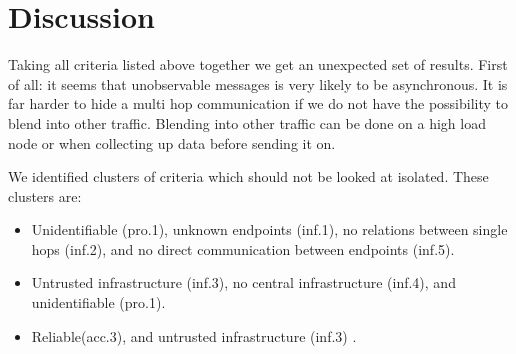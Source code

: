 \documentclass[12pt,journal,compsoc]{IEEEtran}
\begin{document}
\section{Discussion}
Taking all criteria listed above together we get an unexpected set of results. First of all: it seems that unobservable messages is very likely to be asynchronous. It is far harder to hide a multi hop communication if we do not have the possibility to blend into other traffic. Blending into other traffic can be done on a high load node or when collecting up data before sending it on.
\par
We identified clusters of criteria which should not be looked at isolated. These clusters are:

\begin{itemize}
	\item Unidentifiable (pro.1), unknown endpoints (inf.1), no relations between single hops (inf.2), and no direct communication between endpoints (inf.5).
	\item Untrusted infrastructure (inf.3), no central infrastructure (inf.4), and unidentifiable (pro.1).
	\item Reliable(acc.3), and untrusted infrastructure (inf.3) .
\end{itemize}
\end{document}

